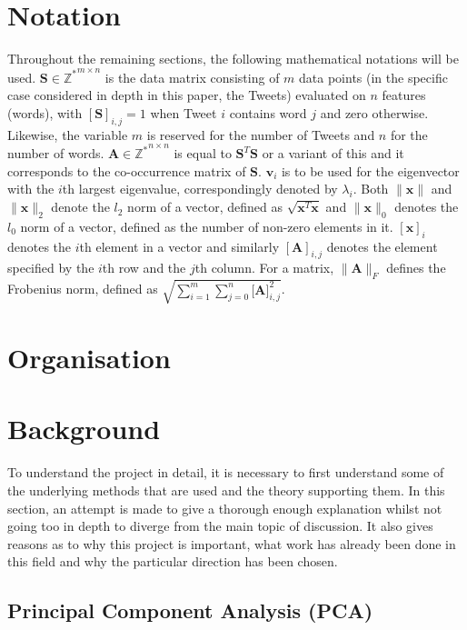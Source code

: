 \documentclass[11pt,a4paper]{article}
\begin{document}
\section{Notation}

Throughout the remaining sections, the following mathematical notations will be used. $\mathbf{S} \in \mathbb{Z^*}^{m\times n}$ is the data matrix consisting of $m$ data points (in the specific case considered in depth in this paper, the Tweets) evaluated on $n$ features (words), with $[\mathbf{S}]_{i,j} = 1$ when Tweet $i$ contains word $j$ and zero otherwise. Likewise, the variable $m$ is reserved for the number of Tweets and $n$ for the number of words. $\mathbf{A} \in \mathbb{Z^*}^{n \times n}$ is equal to $\mathbf{S}^T\mathbf{S}$ or a variant of this and it corresponds to the co-occurrence matrix of $\mathbf{S}$. $\mathbf{v}_i$ is to be used for the eigenvector with the $i$th largest eigenvalue, correspondingly denoted by $\lambda_i$. Both $\|\mathbf{x}\|$ and $\|\mathbf{x}\|_2$ denote the $l_2$ norm of a vector, defined as $\sqrt{\mathbf{x}^T\mathbf{x}}$ and $\|\mathbf{x}\|_0$ denotes the $l_0$ norm of a vector, defined as the number of non-zero elements in it. $[\mathbf{x} ]_i$ denotes the $i$th element in a vector and similarly $[\mathbf{A}]_{i, j}$ denotes the element specified by the $i$th row and the $j$th column. For a matrix, $\|\mathbf{A}\|_F$ defines the Frobenius norm, defined as $\sqrt{\sum^m_{i=1}{\sum_{j=0}^n{\mathbf{[A}]_{i, j}^2}}}$.

\section{Organisation}
\section{Background}
To understand the project in detail, it is necessary to first understand some of the underlying methods that are used and the theory supporting them. In this section, an attempt is made to give a thorough enough explanation whilst not going too in depth to diverge from the main topic of discussion. It also gives reasons as to why this project is important, what work has already been done in this field and why the particular direction has been chosen. 



\subsection{Principal Component Analysis (PCA)}
\end{document}
